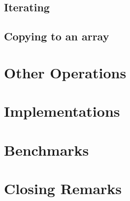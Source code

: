 \documentclass{article}
\begin{document}
	
	
	
	
	
	
	
	
	\subsection{Iterating}
	
	
	
	
	
	
	
	
	
	\subsection{Copying to an array}
	
	

	
	
	
	
	
	
	\section{Other Operations}
	
	\section{Implementations}
	
	\section{Benchmarks}
	
	\section{Closing Remarks}
	
	\newpage
	
	
\end{document}
